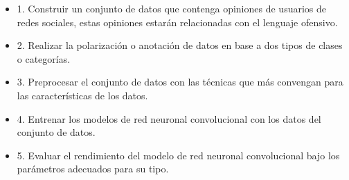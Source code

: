 \begin{itemize}
	\item	1. Construir un conjunto de datos que contenga opiniones de usuarios de redes sociales, estas opiniones  estarán relacionadas con el lenguaje ofensivo.
	\item 2. Realizar la polarización o anotación de datos en base a dos tipos de clases o categorías.
	\item 3. Preprocesar el conjunto de datos con las técnicas que más convengan para las características de los datos.
	\item 4. Entrenar los modelos de red neuronal convolucional con los datos del conjunto de datos.
	\item 5. Evaluar el rendimiento del modelo de red neuronal convolucional bajo los parámetros adecuados para su tipo.
\end{itemize}